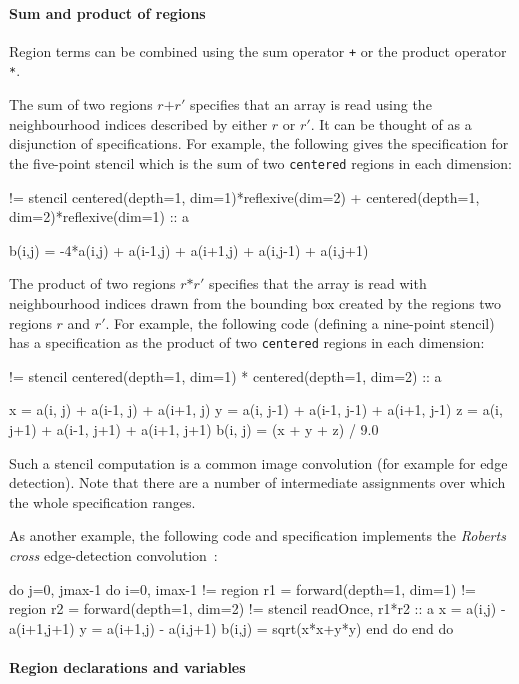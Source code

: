 \documentclass[9pt]{sigplanconf}
\newcommand{\sten}[1]{\textcolor{darkdarkgreen}{\!#1}}
\theoremstyle{definition}
\newcommand{\term}[1]{\texttt{#1}}
\begin{document}
\paragraph{Sum and product of regions}
Region terms can be combined using the sum operator
\term{+} or the product operator \term{*}.

The sum of two regions $r \texttt{+} r'$ specifies that an array is
read using the neighbourhood indices described by either $r$ or
$r'$. It can be thought of as a disjunction of specifications. For
example, the following gives the specification for the five-point
stencil which is the sum of two \texttt{centered} regions in each
dimension:
\begin{ExmVerbatim}
!= stencil centered(depth=1, dim=1)*reflexive(dim=2)
         + centered(depth=1, dim=2)*reflexive(dim=1) :: a

b(i,j) = -4*a(i,j) + a(i-1,j) + a(i+1,j)
                   + a(i,j-1) + a(i,j+1)
\end{ExmVerbatim}
The product of two regions $r \texttt{*} r'$ specifies that the array
is read with neighbourhood indices drawn from the bounding box created
by the regions two regions $r$ and $r'$. For example, the following
code (defining a nine-point stencil) has a specification as the
product of two \texttt{centered} regions in each dimension:
\begin{ExmVerbatim}
!= stencil centered(depth=1, dim=1)
         * centered(depth=1, dim=2) :: a

x = a(i, j)   + a(i-1, j)   + a(i+1, j)
y = a(i, j-1) + a(i-1, j-1) + a(i+1, j-1)
z = a(i, j+1) + a(i-1, j+1) + a(i+1, j+1)
b(i, j) = (x + y + z) / 9.0
\end{ExmVerbatim}
Such a stencil computation is a common image convolution (for example
for edge detection). 
Note that there are a number of intermediate assignments over which
the whole specification ranges. 

As another example, the following code and specification
implements the \emph{Roberts cross}
edge-detection convolution~\cite{davis1975survey}:
\begin{ExmVerbatim}
do j=0, jmax-1
    do i=0, imax-1
\sten{      != region r1 = forward(depth=1, dim=1)}
\sten{      != region r2 = forward(depth=1, dim=2)}
\sten{      != stencil readOnce, r1*r2 :: a}
      x = a(i,j) - a(i+1,j+1)
      y = a(i+1,j) - a(i,j+1)
    b(i,j) = sqrt(x*x+y*y)
   end do
end do
\end{ExmVerbatim}

\paragraph{Region declarations and variables}
\end{document}
